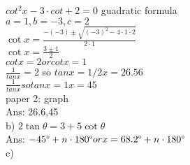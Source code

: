 \documentclass{article}
\begin{document}
  $cot^2x-3\cdot cot+2=0$ guadratic formula\\
  $a=1,b=-3,c=2$\\
  $\cot x=\frac{-(-3)\pm\sqrt{(-3)^2-4\cdot1\cdot2}}{2\cdot1}$\\
  $\cot x=\frac{3\pm1}{2}$\\
  $cot x=2 or cot x=1$\\
  $\frac{1}{tan x}=2$ so $tan x=1/2 x=26.56$\\
  $\frac{1}{tan x} so tan x=1 x=45$\\
  paper 2: graph\\
  Ans: 26.6,45\\
  b) $2\tan\theta=3+5\cot\theta$\\
  Ans: $-45\degree+n\cdot180\degree or x=68.2\degree+n\cdot180\degree$\\
  c) 

  

   
\end{document}
